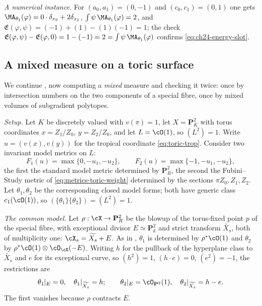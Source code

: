 \begin{example}
\emph{A numerical instance.}  For \((a_0,a_1)=(0,-1)\) and
\((c_0,c_1)=(0,1)\) one gets
\(\MA_{\theta_1}(\varphi)=0\cdot\delta_{x_0}+2\delta_{x_1}\),
\(\int\psi\,\MA_{\theta_1}(\varphi)=2\), and
\(\mathfrak E(\varphi,\psi)=(-1)+(1)-(1)(-1)=1\); the check
\(\mathfrak E(\varphi,\psi)-\mathfrak E(\varphi,0)
 =1-(-1)=2=\int\psi\,\MA_{\theta_1}(\varphi)\) confirms
\eqref{eq:ch24-energy-slot}.
\end{example}

\subsection{A mixed measure on a toric surface}
\label{sec:ch24-ex-toric}

\begin{example}
\label{ex:ch24-toric-surface-mixed}
We continue , now computing a
\emph{mixed} measure and checking it twice: once by intersection numbers on
the two components of a special fibre, once by mixed volumes of subgradient
polytopes.

\emph{Setup.}  Let \(K\) be discretely valued with \(v(\pi)=1\), let
\(X=\mathbf P^2_K\) with torus coordinates \(x=Z_1/Z_0\), \(y=Z_2/Z_0\), and
let \(L=\cO(1)\), so \((L^2)=1\).  Write \(u=(v(x),v(y))\) for the
tropical coordinate \eqref{eq:toric-trop}.  Consider two invariant model
metrics on \(L\):
\[
 F_1(u)=\max\{0,-u_1,-u_2\},
 \qquad
 F_2(u)=\max\{-1,-u_1,-u_2\},
\]
the first the standard model metric determined by \(\mathbf P^2_R\), the
second the Fubini--Study metric of \eqref{eq:metrics-toric-weight}
determined by the sections \(\pi Z_0,Z_1,Z_2\).  Let \(\theta_1,\theta_2\)
be the corresponding closed model forms; both have generic class
\(c_1(\cO(1))\), so \((\{\theta_1\}\{\theta_2\})=(L^2)=1\).

\emph{The common model.}  Let \(\rho:\cX\to\mathbf P^2_R\) be the blowup of
the torus-fixed point \(p\) of the special fibre, with exceptional divisor
\(E\simeq\mathbf P^2_k\) and strict transform \(\widetilde{X_s}\), both of
multiplicity one:
\(\cX_s=\widetilde{X_s}+E\).  As in
, \(\theta_1\) is determined by
\(\rho^*\cO(1)\) and \(\theta_2\) by
\(\rho^*\cO(1)\otimes\cO_{\cX}(-E)\).  Writing \(h\) for the pullback of the
hyperplane class to \(\widetilde{X_s}\) and \(e\) for its exceptional curve,
so \((h^2)=1\), \((h\cdot e)=0\), \((e^2)=-1\), the restrictions are
\[
 \theta_1|_{E}=0,\quad \theta_1|_{\widetilde{X_s}}=h;
 \qquad
 \theta_2|_{E}=\cO_{\mathbf P^2}(1),\quad
 \theta_2|_{\widetilde{X_s}}=h-e .
\]
The first vanishes because \(\rho\) contracts \(E\).


\end{example}
